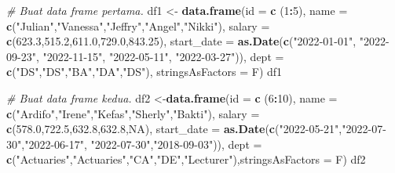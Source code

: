 \documentclass[
]{book}
\newenvironment{Shaded}{\begin{snugshade}}{\end{snugshade}}
\newcommand{\AttributeTok}[1]{\textcolor[rgb]{0.13,0.29,0.53}{#1}}
\newcommand{\CommentTok}[1]{\textcolor[rgb]{0.56,0.35,0.01}{\textit{#1}}}
\newcommand{\ConstantTok}[1]{\textcolor[rgb]{0.56,0.35,0.01}{#1}}
\newcommand{\DecValTok}[1]{\textcolor[rgb]{0.00,0.00,0.81}{#1}}
\newcommand{\FloatTok}[1]{\textcolor[rgb]{0.00,0.00,0.81}{#1}}
\newcommand{\FunctionTok}[1]{\textcolor[rgb]{0.13,0.29,0.53}{\textbf{#1}}}
\newcommand{\NormalTok}[1]{#1}
\newcommand{\OtherTok}[1]{\textcolor[rgb]{0.56,0.35,0.01}{#1}}
\newcommand{\SpecialCharTok}[1]{\textcolor[rgb]{0.81,0.36,0.00}{\textbf{#1}}}
\newcommand{\StringTok}[1]{\textcolor[rgb]{0.31,0.60,0.02}{#1}}
\begin{document}
\begin{Shaded}
\begin{Highlighting}[]
\CommentTok{\# Buat data frame pertama.}
\NormalTok{df1 }\OtherTok{\textless{}{-}} \FunctionTok{data.frame}\NormalTok{(}\AttributeTok{id =} \FunctionTok{c}\NormalTok{ (}\DecValTok{1}\SpecialCharTok{:}\DecValTok{5}\NormalTok{), }
                \AttributeTok{name =} \FunctionTok{c}\NormalTok{(}\StringTok{"Julian"}\NormalTok{,}\StringTok{"Vanessa"}\NormalTok{,}\StringTok{"Jeffry"}\NormalTok{,}\StringTok{"Angel"}\NormalTok{,}\StringTok{"Nikki"}\NormalTok{),}
              \AttributeTok{salary =} \FunctionTok{c}\NormalTok{(}\FloatTok{623.3}\NormalTok{,}\FloatTok{515.2}\NormalTok{,}\FloatTok{611.0}\NormalTok{,}\FloatTok{729.0}\NormalTok{,}\FloatTok{843.25}\NormalTok{), }
          \AttributeTok{start\_date =} \FunctionTok{as.Date}\NormalTok{(}\FunctionTok{c}\NormalTok{(}\StringTok{"2022{-}01{-}01"}\NormalTok{, }\StringTok{"2022{-}09{-}23"}\NormalTok{, }\StringTok{"2022{-}11{-}15"}\NormalTok{,                                               }\StringTok{"2022{-}05{-}11"}\NormalTok{, }\StringTok{"2022{-}03{-}27"}\NormalTok{)),}
                \AttributeTok{dept =} \FunctionTok{c}\NormalTok{(}\StringTok{"DS"}\NormalTok{,}\StringTok{"DS"}\NormalTok{,}\StringTok{"BA"}\NormalTok{,}\StringTok{"DA"}\NormalTok{,}\StringTok{"DS"}\NormalTok{), }\AttributeTok{stringsAsFactors =}\NormalTok{ F)}
\NormalTok{df1}
\end{Highlighting}
\end{Shaded}

\begin{Shaded}
\begin{Highlighting}[]
\CommentTok{\# Buat data frame kedua.}
\NormalTok{df2 }\OtherTok{\textless{}{-}}\FunctionTok{data.frame}\NormalTok{(}\AttributeTok{id =} \FunctionTok{c}\NormalTok{ (}\DecValTok{6}\SpecialCharTok{:}\DecValTok{10}\NormalTok{), }
               \AttributeTok{name =} \FunctionTok{c}\NormalTok{(}\StringTok{"Ardifo"}\NormalTok{,}\StringTok{"Irene"}\NormalTok{,}\StringTok{"Kefas"}\NormalTok{,}\StringTok{"Sherly"}\NormalTok{,}\StringTok{"Bakti"}\NormalTok{),}
             \AttributeTok{salary =} \FunctionTok{c}\NormalTok{(}\FloatTok{578.0}\NormalTok{,}\FloatTok{722.5}\NormalTok{,}\FloatTok{632.8}\NormalTok{,}\FloatTok{632.8}\NormalTok{,}\ConstantTok{NA}\NormalTok{), }
         \AttributeTok{start\_date =} \FunctionTok{as.Date}\NormalTok{(}\FunctionTok{c}\NormalTok{(}\StringTok{"2022{-}05{-}21"}\NormalTok{,}\StringTok{"2022{-}07{-}30"}\NormalTok{,}\StringTok{"2022{-}06{-}17"}\NormalTok{,}
                                \StringTok{"2022{-}07{-}30"}\NormalTok{,}\StringTok{"2018{-}09{-}03"}\NormalTok{)),}
               \AttributeTok{dept =} \FunctionTok{c}\NormalTok{(}\StringTok{"Actuaries"}\NormalTok{,}\StringTok{"Actuaries"}\NormalTok{,}\StringTok{"CA"}\NormalTok{,}\StringTok{"DE"}\NormalTok{,}\StringTok{"Lecturer"}\NormalTok{),}\AttributeTok{stringsAsFactors =}\NormalTok{ F)}
\NormalTok{df2}
\end{Highlighting}
\end{Shaded}
\end{document}
